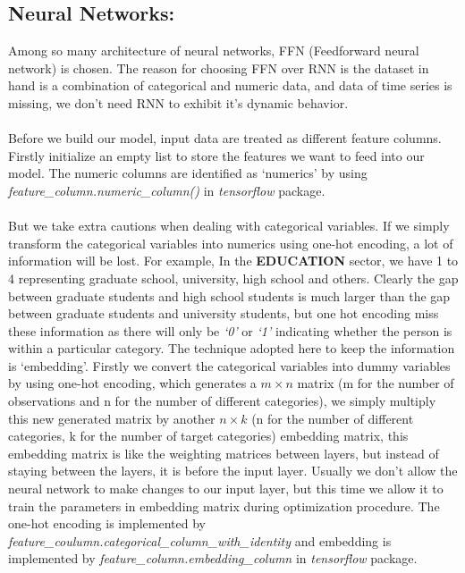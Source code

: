 \documentclass{article}
\begin{document}
\subsection{Neural Networks:}
Among so many architecture of neural networks, FFN (Feedforward neural network) is chosen. The reason for choosing FFN over RNN is the dataset in hand is a combination of categorical and numeric data, and data of time series is missing, we don’t need RNN to exhibit it’s dynamic behavior. \\ \\

Before we build our model, input data are treated as different feature columns. Firstly initialize an empty list to store the features we want to feed into our model. The numeric columns are identified as ‘numerics’ by using \textit{feature\_column.numeric\_column()} in \textit{tensorflow} package. \\ \\
But we take extra cautions when dealing with categorical variables. If we simply transform the categorical variables into numerics using one-hot encoding, a lot of information will be lost. For example, In the \textbf{EDUCATION} sector, we have 1 to 4 representing graduate school, university, high school and others. Clearly the gap between graduate students and high school students is much larger than the gap between graduate students and university students, but one hot encoding miss these information as there will only be \textit{‘0’} or \textit{‘1’} indicating whether the person is within a particular category. The technique adopted here to keep the information is ‘embedding’\cite{embedding}. Firstly we convert the categorical variables into dummy variables by using one-hot encoding, which generates a $m \times n$ matrix (m for the number of observations and n for the number of different categories), we simply multiply this new generated matrix by another $n \times k$ (n for the number of different categories, k for the number of target categories) embedding matrix, this embedding matrix is like the weighting matrices between layers, but instead of staying between the layers, it is before the input layer. Usually we don’t allow the neural network to make changes to our input layer, but this time we allow it to train the parameters in embedding matrix during optimization procedure. The one-hot encoding is implemented by 
\textit{feature\_coulumn.categorical\_column\_with\_identity} and embedding is implemented by  \textit{feature\_column.embedding\_column} in \textit{tensorflow} package.\\ \\
\end{document}
